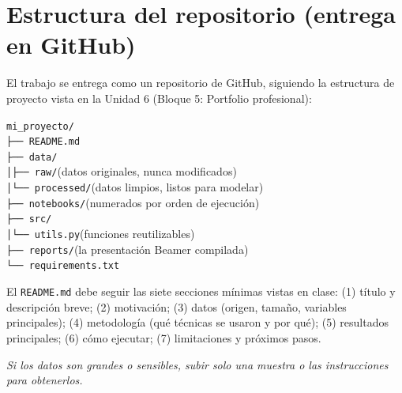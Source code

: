 \documentclass[11pt,a4paper]{article}
\newcommand{\codigo}[1]{\texttt{#1}}
\begin{document}
\section{Estructura del repositorio (entrega en GitHub)}
El trabajo se entrega como un repositorio de GitHub, siguiendo la estructura de proyecto vista en la Unidad 6 (Bloque 5: Portfolio profesional):
\begin{center}
\begin{minipage}{0.82\textwidth}
\codigo{mi\_proyecto/}\\
\codigo{\phantom{x}├── README.md}\\
\codigo{\phantom{x}├── data/}\\
\codigo{\phantom{x}│\phantom{xx}├── raw/}\hfill (datos originales, nunca modificados)\\
\codigo{\phantom{x}│\phantom{xx}└── processed/}\hfill (datos limpios, listos para modelar)\\
\codigo{\phantom{x}├── notebooks/}\hfill (numerados por orden de ejecuci\'on)\\
\codigo{\phantom{x}├── src/}\\
\codigo{\phantom{x}│\phantom{xx}└── utils.py}\hfill (funciones reutilizables)\\
\codigo{\phantom{x}├── reports/}\hfill (la presentaci\'on Beamer compilada)\\
\codigo{\phantom{x}└── requirements.txt}
\end{minipage}
\end{center}

El \codigo{README.md} debe seguir las siete secciones m\'inimas vistas en clase: (1) t\'itulo y descripci\'on breve; (2) motivaci\'on; (3) datos (origen, tama\~no, variables principales); (4) metodolog\'ia (qu\'e t\'ecnicas se usaron y por qu\'e); (5) resultados principales; (6) c\'omo ejecutar; (7) limitaciones y pr\'oximos pasos.

\textit{Si los datos son grandes o sensibles, subir solo una muestra o las instrucciones para obtenerlos.}
\end{document}
